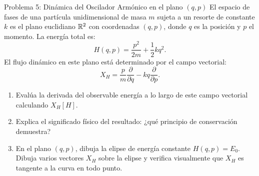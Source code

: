 \documentclass[11pt,letterpaper]{article}
\begin{document}

\begin{infobox}{Problema 5: Dinámica del Oscilador Armónico en el plano $(q, p)$}
El espacio de fases de una partícula unidimensional de masa $m$ sujeta a un resorte de constante $k$ es el plano euclidiano $\mathbb{R}^2$ con coordenadas $(q, p)$, donde $q$ es la posición y $p$ el momento. La energía total es:
\[
H(q, p) = \frac{p^2}{2m} + \frac{1}{2} k q^2.
\]
El flujo dinámico en este plano está determinado por el campo vectorial:
\[
X_H = \frac{p}{m} \frac{\partial}{\partial q} - kq \frac{\partial}{\partial p}.
\]
\begin{enumerate}[label=\alph*)]
    \item Evalúa la derivada del observable energía a lo largo de este campo vectorial calculando $X_H[H]$.
    \item Explica el significado físico del resultado: ¿qué principio de conservación demuestra?
    \item En el plano $(q, p)$, dibuja la elipse de energía constante $H(q, p) = E_0$. Dibuja varios vectores $X_H$ sobre la elipse y verifica visualmente que $X_H$ es tangente a la curva en todo punto.
\end{enumerate}
\end{infobox}
\end{document}
